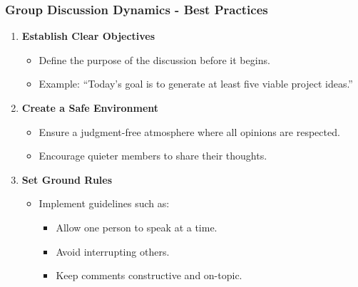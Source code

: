 \documentclass{beamer}
\begin{document}
\begin{frame}[fragile]
    \frametitle{Group Discussion Dynamics - Best Practices}
    \begin{enumerate}
        \item \textbf{Establish Clear Objectives}
            \begin{itemize}
                \item Define the purpose of the discussion before it begins.
                \item Example: ``Today's goal is to generate at least five viable project ideas.''
            \end{itemize}
        \item \textbf{Create a Safe Environment}
            \begin{itemize}
                \item Ensure a judgment-free atmosphere where all opinions are respected.
                \item Encourage quieter members to share their thoughts.
            \end{itemize}
        \item \textbf{Set Ground Rules}
            \begin{itemize}
                \item Implement guidelines such as:
                    \begin{itemize}
                        \item Allow one person to speak at a time.
                        \item Avoid interrupting others.
                        \item Keep comments constructive and on-topic.
                    \end{itemize}
            \end{itemize}
    \end{enumerate}
\end{frame}
\end{document}
